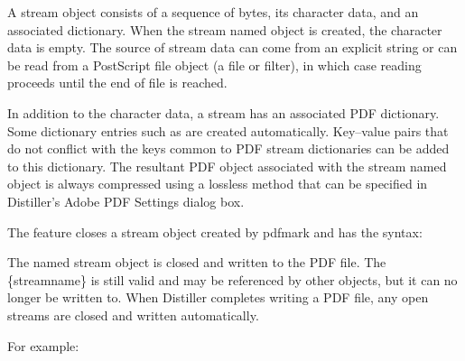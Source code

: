\documentclass[letterpaper,12pt,english,openany,oneside]{sphinxmanual}
\begin{document}
A stream object consists of a sequence of bytes, its character data, and an associated dictionary. When the stream named object is created, the character data is empty. The source of stream data can come from an explicit string or can be read from a PostScript file object (a file or filter), in which case reading proceeds until the end of file is reached.

In addition to the character data, a stream has an associated PDF dictionary. Some dictionary entries such as  are created automatically. Key–value pairs that do not conflict with the keys common to PDF stream dictionaries can be added to this dictionary. The resultant PDF object associated with the stream named object is always compressed using a lossless method that can be specified in Distiller’s Adobe PDF Settings dialog box.

The  feature closes a stream object created by pdfmark and has the syntax:

\begin{sphinxVerbatim}[commandchars=\\\{\}]
\PYG{p}{[}   
  
\end{sphinxVerbatim}

The named stream object is closed and written to the PDF file. The \{streamname\} is still valid and may be referenced by other objects, but it can no longer be written to. When Distiller completes writing a PDF file, any open streams are closed and written automatically.

For example:
\end{document}

